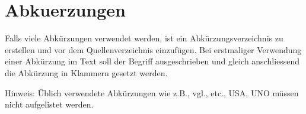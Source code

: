 \part{Abkuerzungen}
Falls viele Abkürzungen verwendet werden, ist ein Abkürzungsverzeichnis zu erstellen und vor dem Quellenverzeichnis einzufügen. Bei erstmaliger Verwendung einer Abkürzung im Text soll der Begriff ausgeschrieben und gleich anschliessend die Abkürzung in Klammern gesetzt werden. 

Hinweis: 
Üblich verwendete Abkürzungen wie z.B., vgl., etc., USA, UNO müssen nicht aufgelistet werden.